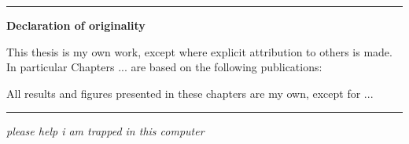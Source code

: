 \begin{titlepage}
\cleardoublepage

\begin{vcenterpage}
\noindent\rule[2pt]{\textwidth}{0.5pt}
\begin{center}
{\large\textbf{Declaration of originality}}
\end{center}
This thesis is my own work, except where explicit attribution to others is made. In particular Chapters ... are based on the following publications:

All results and figures presented in these chapters are my own, except for ...

\noindent\rule[2pt]{\textwidth}{0.5pt}
\end{vcenterpage}

\cleardoublepage

\thispagestyle{empty}

\begin{center}
 \emph{please help i am trapped in this computer}
\end{center}

\end{titlepage}
\sloppy

\titlepage
